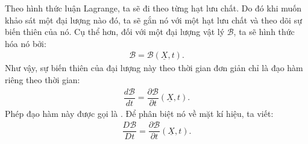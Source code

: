 \documentclass[../../../main.tex]{subfiles}
\begin{document}
	Theo hình thức luận Lagrange, ta sẽ đi theo từng hạt lưu chất. Do đó khi muốn khảo sát một đại lượng nào đó, ta sẽ gắn nó với một hạt lưu chất và theo dõi sự biến thiên của nó. Cụ thể hơn, đối với một đại lượng vật lý $\mathscr{B}$, ta sẽ hình thức hóa nó bởi:
		\begin{align}
			\mathscr{B}=\mathscr{B}\left(\underline{X},t\right).
		\end{align}
	Như vậy, sự biến thiên của đại lượng này theo thời gian đơn giản chỉ là đạo hàm riêng theo thời gian:
		\begin{align}
			\dfrac{d\mathscr{B}}{dt}=\dfrac{\partial\mathscr{B}}{\partial t}\left(\underline{X},t\right).
		\end{align}
	Phép đạo hàm này được gọi là . Để phân biệt nó về mặt kí hiệu, ta viết:
		\begin{align}
			\boxed{\dfrac{D\mathscr{B}}{Dt}=\dfrac{\partial\mathscr{B}}{\partial t}\left(\underline{X},t\right)}.
		\end{align}
	
\end{document}
